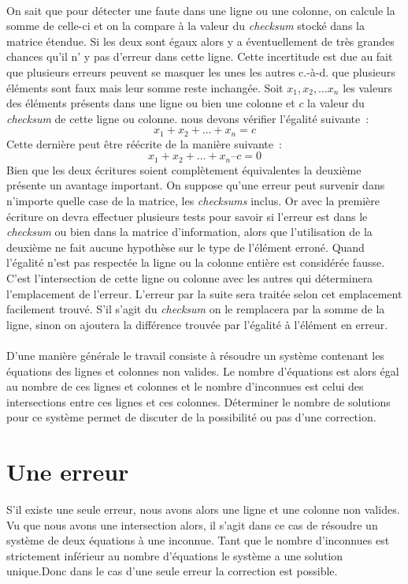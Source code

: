 \documentclass[a4paper,10pt]{report}
\begin{document}
\paragraph*{}
On sait que pour détecter une faute dans une ligne ou une colonne,  on calcule la somme de celle-ci et on la compare à la 
valeur du \textit{checksum} stocké dans la matrice étendue. Si les deux sont égaux alors y a éventuellement de très grandes 
chances qu’il n’ y pas d’erreur dans cette ligne. Cette incertitude est due au fait que plusieurs erreurs peuvent se masquer 
les unes les autres c.-à-d. que plusieurs éléments sont faux mais leur somme reste inchangée. Soit $x_1, x_2,\ldots x_n$ 
les valeurs des éléments présents dans une ligne ou bien une colonne et $c$ la valeur du \textit{checksum} de cette ligne 
ou colonne. nous devons vérifier l’égalité suivante : \[x_1 + x_2 + \ldots + x_n = c\]
Cette dernière peut être réécrite de la manière suivante : \[x_1 + x_2 + \ldots + x_n – c = 0\]
Bien que les deux écritures soient complètement équivalentes la deuxième présente un avantage important. On suppose 
qu’une erreur peut survenir dans n’importe quelle case de la matrice, les \textit{checksums} inclus. Or avec la 
première écriture on devra effectuer plusieurs tests pour savoir si l’erreur est dans le \textit{checksum} ou bien dans 
la matrice d’information, alors que l’utilisation de la deuxième ne fait aucune hypothèse sur le type de l’élément erroné. 
Quand l’égalité n’est pas respectée la ligne ou la colonne entière est considérée fausse. C’est l’intersection de cette 
ligne ou colonne avec les autres qui déterminera l’emplacement de l’erreur. L’erreur par la suite sera traitée selon cet 
emplacement facilement trouvé. S’il s’agit du \textit{checksum} on le remplacera par la somme de la ligne, sinon on ajoutera 
la différence trouvée par l’égalité à l’élément en erreur.
\paragraph*{}
D’une manière générale le travail consiste à résoudre un système contenant les équations des lignes et colonnes non valides. 
Le nombre d’équations est alors égal au nombre de ces lignes et colonnes et le nombre d’inconnues est celui des intersections 
entre ces lignes et ces colonnes.\newline
Déterminer le nombre de solutions pour ce système permet de discuter de la possibilité ou pas d’une correction.

\section{Une erreur}
S’il existe une seule erreur, nous avons alors une ligne et une colonne non valides. Vu que nous avons une intersection 
alors, il s’agit dans ce cas de résoudre un système de deux équations à une inconnue.\newline
Tant que le nombre d’inconnues est strictement inférieur au nombre d’équations le système a une solution unique.Donc 
dans le cas d’une seule erreur la correction est possible.
\end{document}
